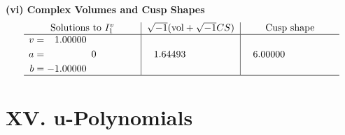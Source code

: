 \documentclass[1p]{elsarticle_modified}
\theoremstyle{definition}
\newcommand{\I}{\sqrt{-1}}
\begin{document}
\newpage\flushleft \textbf{(vi) Complex Volumes and Cusp Shapes}
$$\begin{array}{c|c|c}  
\text{Solutions to }I^v_{1}& \I (\text{vol} + \sqrt{-1}CS) & \text{Cusp shape}\\
 \hline 
\begin{aligned}
v &= \phantom{-}1.00000\phantom{ +0.000000I} \\
a &= \phantom{-0.000000 } 0 \\
b &= -1.00000\phantom{ +0.000000I}\end{aligned}
 & \phantom{-}1.64493\phantom{ +0.000000I} & \phantom{-}6.00000\phantom{ +0.000000I}\\
 \hline 
 \end{array}$$\newpage
\newpage\renewcommand{\arraystretch}{1}
\centering \section*{ XV. u-Polynomials}
\end{document}
